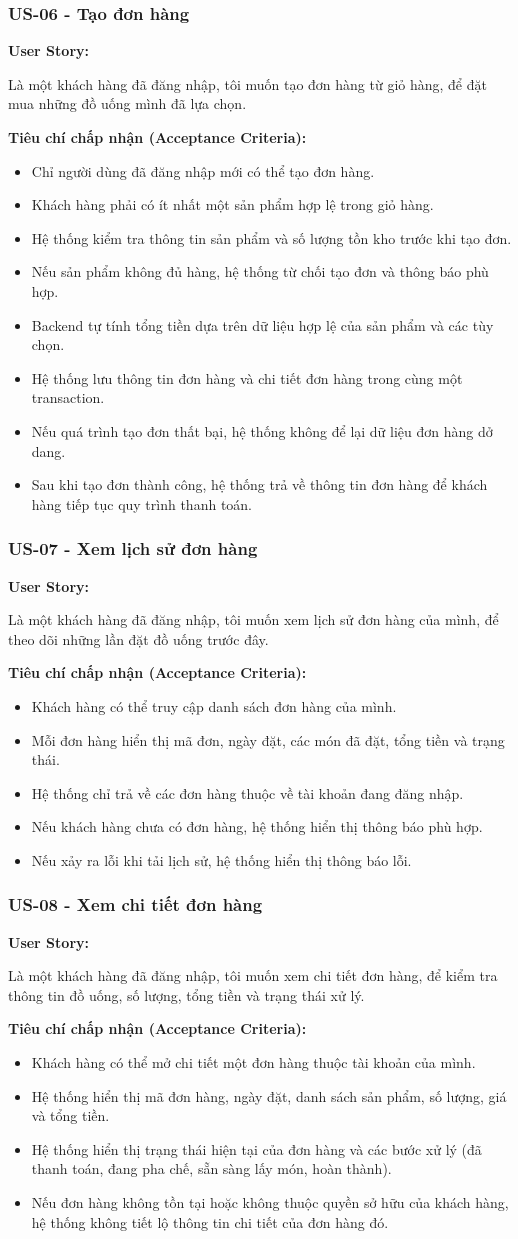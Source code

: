 \documentclass[12pt,a4paper]{article}
\newcommand{\userstory}[2]{%
  \noindent\textbf{User Story:}\par
  #1\par
  \hspace*{\parindent}\textbf{Tiêu chí chấp nhận (Acceptance Criteria):}
  \begin{itemize}
    #2
  \end{itemize}}
\begin{document}
\subsubsection{US-06 - Tạo đơn hàng}
\userstory{Là một khách hàng đã đăng nhập, tôi muốn tạo đơn hàng từ giỏ hàng, để đặt mua những đồ uống mình đã lựa chọn.}{
  \item Chỉ người dùng đã đăng nhập mới có thể tạo đơn hàng.
  \item Khách hàng phải có ít nhất một sản phẩm hợp lệ trong giỏ hàng.
  \item Hệ thống kiểm tra thông tin sản phẩm và số lượng tồn kho trước khi tạo đơn.
  \item Nếu sản phẩm không đủ hàng, hệ thống từ chối tạo đơn và thông báo phù hợp.
  \item Backend tự tính tổng tiền dựa trên dữ liệu hợp lệ của sản phẩm và các tùy chọn.
  \item Hệ thống lưu thông tin đơn hàng và chi tiết đơn hàng trong cùng một transaction.
  \item Nếu quá trình tạo đơn thất bại, hệ thống không để lại dữ liệu đơn hàng dở dang.
  \item Sau khi tạo đơn thành công, hệ thống trả về thông tin đơn hàng để khách hàng tiếp tục quy trình thanh toán.
}

\subsubsection{US-07 - Xem lịch sử đơn hàng}
\userstory{Là một khách hàng đã đăng nhập, tôi muốn xem lịch sử đơn hàng của mình, để theo dõi những lần đặt đồ uống trước đây.}{
  \item Khách hàng có thể truy cập danh sách đơn hàng của mình.
  \item Mỗi đơn hàng hiển thị mã đơn, ngày đặt, các món đã đặt, tổng tiền và trạng thái.
  \item Hệ thống chỉ trả về các đơn hàng thuộc về tài khoản đang đăng nhập.
  \item Nếu khách hàng chưa có đơn hàng, hệ thống hiển thị thông báo phù hợp.
  \item Nếu xảy ra lỗi khi tải lịch sử, hệ thống hiển thị thông báo lỗi.
}

\subsubsection{US-08 - Xem chi tiết đơn hàng}
\userstory{Là một khách hàng đã đăng nhập, tôi muốn xem chi tiết đơn hàng, để kiểm tra thông tin đồ uống, số lượng, tổng tiền và trạng thái xử lý.}{
  \item Khách hàng có thể mở chi tiết một đơn hàng thuộc tài khoản của mình.
  \item Hệ thống hiển thị mã đơn hàng, ngày đặt, danh sách sản phẩm, số lượng, giá và tổng tiền.
  \item Hệ thống hiển thị trạng thái hiện tại của đơn hàng và các bước xử lý (đã thanh toán, đang pha chế, sẵn sàng lấy món, hoàn thành).
  \item Nếu đơn hàng không tồn tại hoặc không thuộc quyền sở hữu của khách hàng, hệ thống không tiết lộ thông tin chi tiết của đơn hàng đó.
}
\end{document}
